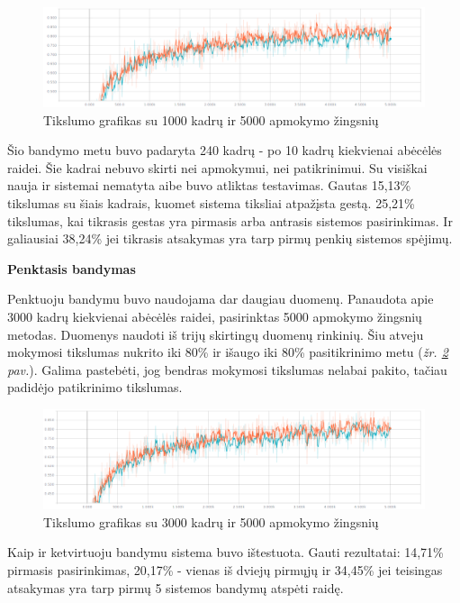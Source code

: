 \documentclass{VUMIFInfKursinis}
\begin{document}
\begin{figure}[H]
	\centering
	\includegraphics[width=.8\linewidth]{img/accuracy3}
	\caption{Tikslumo grafikas su 1000 kadrų ir 5000 apmokymo žingsnių}
	\label{img:acc3}
\end{figure}

Šio bandymo metu buvo padaryta 240 kadrų - po 10 kadrų kiekvienai abėcėlės raidei. Šie kadrai nebuvo skirti nei apmokymui, nei patikrinimui. Su visiškai nauja ir sistemai nematyta aibe buvo atliktas testavimas. Gautas 15,13\% tikslumas su šiais kadrais, kuomet sistema tiksliai atpažįsta gestą. 25,21\% tikslumas, kai tikrasis gestas yra pirmasis arba antrasis sistemos pasirinkimas. Ir galiausiai 38,24\% jei tikrasis atsakymas yra tarp pirmų penkių sistemos spėjimų.

\textbf{Penktasis bandymas}

Penktuoju bandymu buvo naudojama dar daugiau duomenų. Panaudota apie 3000 kadrų kiekvienai abėcėlės raidei, pasirinktas 5000 apmokymo žingsnių metodas. Duomenys naudoti iš trijų skirtingų duomenų rinkinių. Šiu atveju mokymosi tikslumas nukrito iki 80\% ir išaugo iki 80\% pasitikrinimo metu (\textit{žr. \ref{img:acc4} pav.}). Galima pastebėti, jog bendras mokymosi tikslumas nelabai pakito, tačiau padidėjo patikrinimo tikslumas.

\begin{figure}[H]
	\centering
	\includegraphics[width=.8\linewidth]{img/accuracy4}
	\caption{Tikslumo grafikas su 3000 kadrų ir 5000 apmokymo žingsnių}
	\label{img:acc4}
\end{figure}

Kaip ir ketvirtuoju bandymu sistema buvo ištestuota. Gauti rezultatai: 14,71\% pirmasis pasirinkimas, 20,17\% - vienas iš dviejų pirmųjų ir 34,45\% jei teisingas atsakymas yra tarp pirmų 5 sistemos bandymų atspėti raidę.
\end{document}
